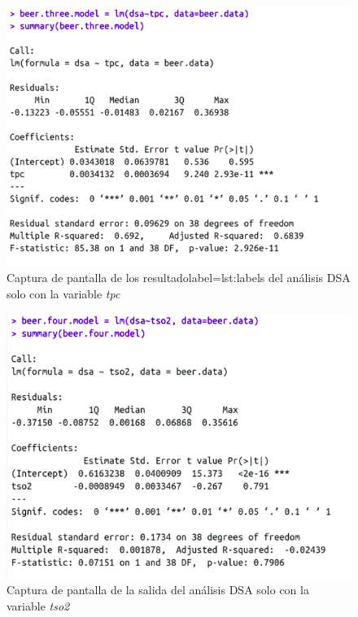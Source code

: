 \documentclass{article}
\begin{document}
\begin{figure}[htbp]
    \centering
    \includegraphics[scale=0.4]{images/dsa_analisis_1_variable.png}
    \caption{Captura de pantalla de los resultadolabel={lst:label}s del análisis DSA solo con la variable \textit{tpc}}
    \label{fig:dsa_1_variable}
\end{figure}


\begin{figure}[htbp]
    \centering
    \includegraphics[scale=0.4]{images/dsa_analisis_tso2.png}
    \caption{Captura de pantalla de la salida del análisis DSA solo con la variable \textit{tso2}}
    \label{fig:dsa_1_variable_tso2}
\end{figure}
\end{document}
